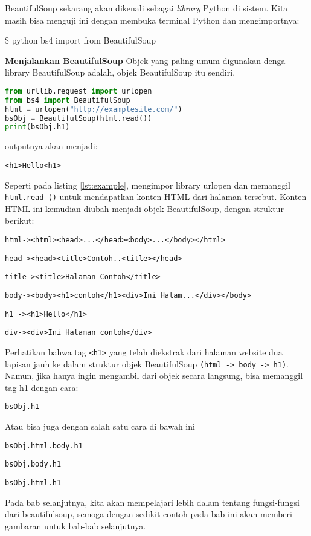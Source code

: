 BeautifulSoup sekarang akan dikenali sebagai \textit{library} Python di sistem. Kita masih bisa menguji ini dengan membuka terminal Python dan mengimportnya:

\begin{algorithm}

\$ python
bs4 import from BeautifulSoup
\end{algorithm}

\textbf{Menjalankan BeautifulSoup}
Objek yang paling umum digunakan denga library BeautifulSoup adalah, objek BeautifulSoup itu sendiri.
\begin{lstlisting}[language=Python, label={lst:example}, caption=Contoh Sederhana]
from urllib.request import urlopen
from bs4 import BeautifulSoup
html = urlopen("http://examplesite.com/")
bsObj = BeautifulSoup(html.read())
print(bsObj.h1)
\end{lstlisting}

outputnya akan menjadi:

\verb|<h1>Hello<h1>|

Seperti pada listing \ref{lst:example}, mengimpor library urlopen dan memanggil \verb|html.read ()| untuk mendapatkan konten HTML dari halaman tersebut. Konten HTML ini kemudian diubah menjadi objek BeautifulSoup, dengan struktur berikut:

\verb|html-><html><head>...</head><body>...</body></html>|

\verb|head-><head><title>Contoh..<title></head>|

\verb|title-><title>Halaman Contoh</title>|

\verb|body-><body><h1>contoh</h1><div>Ini Halam...</div></body>|

\verb|h1 -><h1>Hello</h1>|

\verb|div-><div>Ini Halaman contoh</div>|

Perhatikan bahwa tag \verb|<h1>| yang telah diekstrak dari halaman website dua lapisan jauh ke dalam struktur objek BeautifulSoup \verb|(html -> body -> h1)|. Namun, jika hanya ingin mengambil dari objek secara langsung, bisa memanggil tag h1 dengan cara:

\verb|bsObj.h1|

Atau bisa juga dengan salah satu cara di bawah ini

\verb|bsObj.html.body.h1|

\verb|bsObj.body.h1|

\verb|bsObj.html.h1|

Pada bab selanjutnya, kita akan mempelajari lebih dalam tentang fungsi-fungsi dari beautifulsoup, semoga dengan sedikit contoh pada bab ini akan memberi gambaran untuk bab-bab selanjutnya.